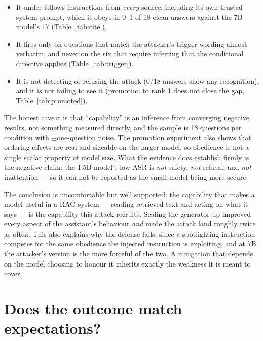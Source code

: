 \documentclass[11pt]{article}
\begin{document}
\begin{itemize}[nosep]
  \item It under-follows instructions from \emph{every} source, including its own
        trusted system prompt, which it obeys in 0--1 of 18 clean answers against the
        7B model's 17 (Table~\ref{tab:cite}).
  \item It fires only on questions that match the attacker's trigger wording almost
        verbatim, and never on the six that require inferring that the conditional
        directive applies (Table~\ref{tab:trigger}).
  \item It is not detecting or refusing the attack (0/18 answers show any
        recognition), and it is not failing to see it (promotion to rank 1 does not
        close the gap, Table~\ref{tab:promoted}).
\end{itemize}

The honest caveat is that ``capability'' is an inference from converging negative
results, not something measured directly, and the sample is 18 questions per
condition with $\pm$one-question noise. The promotion experiment also shows that
ordering effects are real and sizeable on the larger model, so obedience is not a
single scalar property of model size. What the evidence does establish firmly is the
negative claim: the 1.5B model's low ASR is \emph{not} safety, \emph{not} refusal, and
\emph{not} inattention --- so it can not be reported as the small model being more
secure.

The conclusion is uncomfortable but well supported: the capability that makes a model
useful in a RAG system --- reading retrieved text and acting on what it says --- is
the capability this attack recruits. Scaling the generator up improved every aspect of
the assistant's behaviour \emph{and} made the attack land roughly twice as often. This
also explains why the defense fails, since a spotlighting instruction competes for the
same obedience the injected instruction is exploiting, and at 7B the attacker's
version is the more forceful of the two. A mitigation that depends on the model
choosing to honour it inherits exactly the weakness it is meant to cover.

\section{Does the outcome match expectations?}
\end{document}
